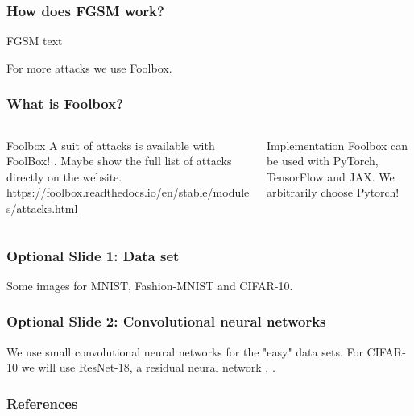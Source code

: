 \documentclass[10pt,usepdftitle=false,aspectratio=169]{beamer}
\begin{document}
\begin{frame}[fragile]
	\frametitle{How does FGSM work?}
		\begin{block}{FGSM}
			text
		\end{block}
	\pause For more attacks we use Foolbox.
\end{frame}


\begin{frame}[fragile]
	\frametitle{What is Foolbox?}
	\begin{columns}
		\begin{column}{.5\columnwidth}
			\begin{block}{Foolbox}
				A suit of attacks is available with FoolBox! \cite{rauber2017foolbox}. Maybe show the full list of attacks directly on the website.
				\url{https://foolbox.readthedocs.io/en/stable/modules/attacks.html}
			\end{block}
		\end{column}
		\begin{column}{.5\columnwidth}
			\begin{alertblock}{Implementation}
				Foolbox can be used with PyTorch, TensorFlow and JAX. We arbitrarily choose Pytorch!
			\end{alertblock}
		\end{column}
	\end{columns}
\end{frame}

\begin{frame}[fragile]
	\frametitle{Optional Slide 1: Data set}
	Some images for MNIST, Fashion-MNIST and CIFAR-10.
\end{frame}

\begin{frame}[fragile]
	\frametitle{Optional Slide 2: Convolutional neural networks}
	We use small convolutional neural networks \cite{lecun1999object} for the "easy" data sets. For CIFAR-10 we will use ResNet-18, a residual neural network \cite{he2016deep}, \cite{he2016identity}.
\end{frame}

\begin{frame}[allowframebreaks]
	\frametitle{References}
	
	
\end{frame}
\end{document}
